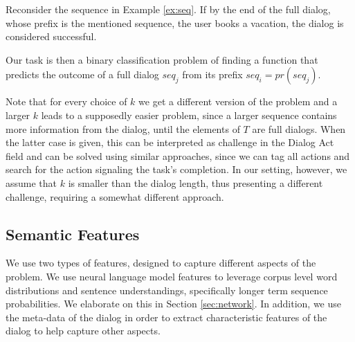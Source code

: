 \begin{example}
Reconsider the sequence in Example \ref{ex:seq}.  
If by the end of the full dialog, whose prefix is the mentioned sequence, 
the user books a vacation, the dialog is considered successful.
\end{example}


Our task is then a binary classification 
problem of finding a function that predicts the outcome 
of a full dialog $seq_j$ from its prefix $seq_i = pr(seq_j)$. 

Note that for every choice of $k$ we get a different 
version of the problem and a larger $k$ leads 
to a supposedly easier problem, since a larger sequence contains 
more information from the dialog, until the elements of $T$ 
are full dialogs. When the latter case is 
given, this can be interpreted as challenge in the Dialog Act field \cite{cs-CL-0006023,DBLP:conf/icassp/JiB05,DBLP:conf/coling/WermterL96} and can be solved using similar approaches, since we 
can tag all actions and search for the action signaling the task's completion. 
In our setting, however, we assume that $k$ is smaller than the dialog 
length, thus presenting a different challenge, requiring a somewhat different approach. 



\subsection{Semantic Features}\label{sec:sem}
We use two types of features, designed to capture
different aspects of the problem. We use neural 
language model features to leverage corpus
level word distributions and sentence understandings, 
specifically longer term
sequence probabilities. 
We elaborate on this in Section \ref{sec:network}. 
In addition, we use the meta-data of 
the dialog in order to extract characteristic features of the dialog 
to help capture other aspects. 


